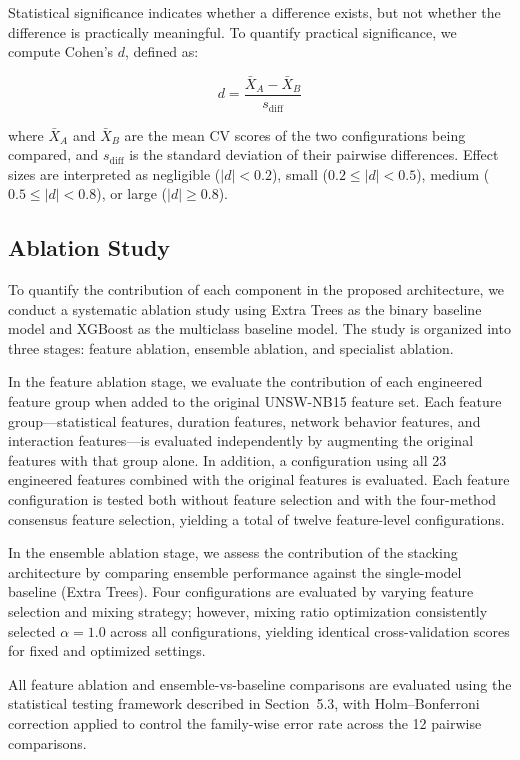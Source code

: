 \documentclass[pdflatex,sn-mathphys-num]{sn-jnl}
\theoremstyle{thmstyleone}%
\theoremstyle{thmstyletwo}%
\theoremstyle{thmstylethree}%
\begin{document}
Statistical significance indicates whether a difference exists, but not whether the difference is practically meaningful. To quantify practical significance, we compute Cohen’s $d$, defined as:

\begin{equation*}
    d = \frac{\bar{X}_A - \bar{X}_B}{s_{\text{diff}}}
\end{equation*}

where $\bar{X}_A$ and $\bar{X}_B$ are the mean CV scores of the two configurations being compared, and $s_{\text{diff}}$ is the standard deviation of their pairwise differences. Effect sizes are interpreted as negligible ($|d| < 0.2$), small ($0.2 \leq |d| < 0.5$), medium ($0.5 \leq |d| < 0.8$), or large ($|d| \geq 0.8$).

\subsection{Ablation Study}

To quantify the contribution of each component in the proposed architecture, we conduct a systematic ablation study using Extra Trees as the binary baseline model and XGBoost as the multiclass baseline model. The study is organized into three stages: feature ablation, ensemble ablation, and specialist ablation.

In the feature ablation stage, we evaluate the contribution of each engineered feature group when added to the original UNSW-NB15 feature set. Each feature group---statistical features, duration features, network behavior features, and interaction features---is evaluated independently by augmenting the original features with that group alone. In addition, a configuration using all 23 engineered features combined with the original features is evaluated. Each feature configuration is tested both without feature selection and with the four-method consensus feature selection, yielding a total of twelve feature-level configurations.

In the ensemble ablation stage, we assess the contribution of the stacking architecture by comparing ensemble performance against the single-model baseline (Extra Trees). Four configurations are evaluated by varying feature selection and mixing strategy; however, mixing ratio optimization consistently selected $\alpha = 1.0$ across all configurations, yielding identical cross-validation scores for fixed and optimized settings.

All feature ablation and ensemble-vs-baseline comparisons are evaluated using the statistical testing framework described in Section~5.3, with Holm--Bonferroni correction applied to control the family-wise error rate  across the 12 pairwise comparisons.
\end{document}
